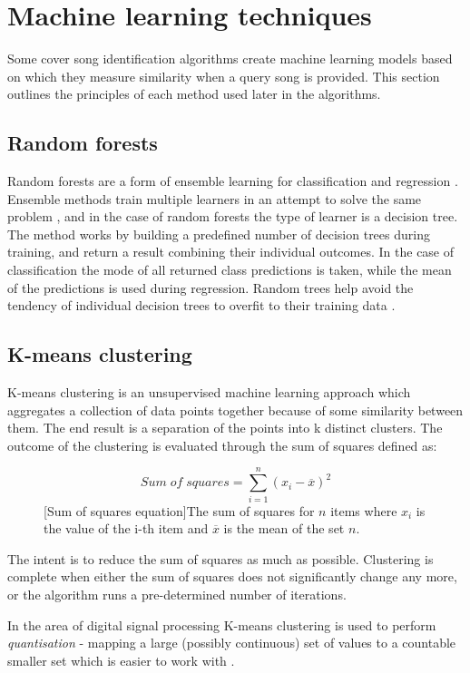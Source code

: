 \section{Machine learning techniques}
\label{sec:machinelearning}
Some cover song identification algorithms create machine learning models based
on which they measure similarity when a query song is provided. This section
outlines the principles of each method used later in the algorithms.

\subsection{Random forests}
\label{subsec:randomforests}
Random forests are a form of ensemble learning for classification and regression
\cite{ho1995random}. Ensemble methods train multiple learners in an attempt to
solve the same problem \cite{zhou2012ensemble}, and in the case of random
forests the type of learner is a decision tree. The method works by building a
predefined number of decision trees during training, and return a result
combining their individual outcomes. In the case of classification the mode of
all returned class predictions is taken, while the mean of the predictions is
used during regression. Random trees help avoid the tendency of individual
decision trees to overfit to their training data \cite{friedman2001elements}.

\subsection{K-means clustering}
\label{subsec:kmeansclustering}
K-means clustering is an unsupervised machine learning approach which aggregates
a collection of data points together because of some similarity between them.
The end result is a separation of the points into k distinct
clusters. The outcome of the clustering is evaluated through the sum of squares
defined as:
\begin{figure}[H]
   \begin{equation}
        Sum\;of\;squares = \sum_{i=1}^{n}(x_i - \overline{x})^2
   \end{equation} 
   [Sum of squares equation]{The sum of squares for $n$ items where $x_i$ is the value of the i-th item and $\overline{x}$ is the mean of the set $n$.}
   \label{fig:sumofsquares}
\end{figure}

The intent is to reduce the sum of squares as much as possible. Clustering is
complete when either the sum of squares does not significantly change any more,
or the algorithm runs a pre-determined number of iterations.

In the area of digital signal processing K-means clustering is used to perform 
\textit{quantisation} - mapping a large (possibly continuous) set of values to a
countable smaller set which is easier to work with \cite{wiki:quantisation}.


